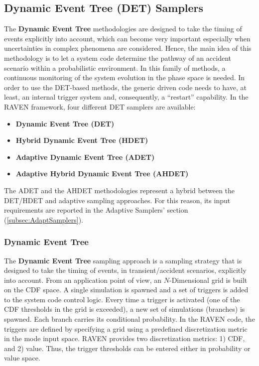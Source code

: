 \subsection{Dynamic Event Tree (DET) Samplers}
\label{subsec:DETSamplers}
The \textbf{Dynamic Event Tree} methodologies are designed to take the timing of
events explicitly into account, which can become very important especially when
uncertainties in complex phenomena are considered.
%
Hence, the main idea of this methodology is to let a system code determine the
pathway of an accident scenario within a probabilistic environment.
%
In this family of methods, a continuous monitoring of the system evolution in
the phase space is needed.
%
In order to use the DET-based methods, the generic driven code needs to have, at
least, an internal trigger system and, consequently, a ``restart'' capability.
%
In the RAVEN framework, four different DET samplers are available:
\begin{itemize}
\item \textbf{Dynamic Event Tree (DET)}
\item \textbf{Hybrid Dynamic Event Tree (HDET)}
\item \textbf{Adaptive Dynamic Event Tree (ADET)}
\item \textbf{Adaptive Hybrid Dynamic Event Tree (AHDET)}
\end{itemize}

The ADET and the AHDET methodologies represent a hybrid between the DET/HDET and adaptive sampling
approaches.
%
For this reason, its input requirements are reported in the Adaptive Samplers'
section (\ref{subsec:AdaptSamplers}).

\subsubsection{Dynamic Event Tree}
\label{subsubsubsec:DET}
The \textbf{Dynamic Event Tree} sampling approach is a sampling strategy that is
designed to take the timing of events, in transient/accident scenarios,
explicitly into account.
%
From an application point of view, an $N$-Dimensional grid is built on the CDF
space.
%
A single simulation is spawned and a set of triggers is added to the system code
control logic.
%
Every time a trigger is activated (one of the CDF thresholds in the grid is
exceeded), a new set of simulations (branches) is spawned.
%
Each branch carries its conditional probability.
%
In the RAVEN code, the triggers are defined by specifying a grid using a
predefined discretization metric in the mode input space.
%
RAVEN provides two discretization metrics: 1) CDF, and 2) value.
%
Thus, the trigger thresholds can be entered either in probability or value
space.
%

